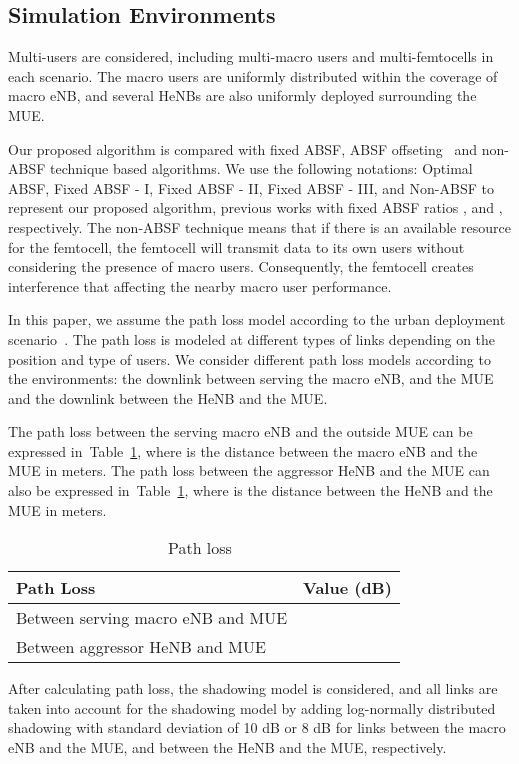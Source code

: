 \documentclass[paper]{ieice}
\begin{document}
\subsection{Simulation Environments}
\label{Eval-Envi}
Multi-users are considered, including multi-macro users and multi-femtocells in each scenario. The macro users are uniformly distributed within the coverage of macro eNB, and several HeNBs are also uniformly deployed surrounding the MUE.

Our proposed algorithm is compared with fixed ABSF, ABSF offseting~\cite{Kamel2013} and non-ABSF technique based algorithms. We use the following notations: Optimal ABSF, Fixed ABSF - I, Fixed ABSF - II, Fixed ABSF - III, and Non-ABSF  to represent our proposed algorithm, previous works with fixed ABSF ratios , and , respectively. The non-ABSF technique means that if there is an available resource for the femtocell, the femtocell will transmit data to its own users without considering the presence of macro users. Consequently, the femtocell creates interference that affecting the nearby macro user performance.

In this paper, we assume the path loss model according to the urban deployment scenario~\cite{R4-092042}. The path loss is modeled at different types of links depending on the position and type of users. We consider different path loss models according to the environments: the downlink between serving the macro eNB, and the MUE and the downlink between the HeNB and the MUE.

The path loss between the serving  macro eNB and the outside MUE can be expressed in~Table~\ref{Tab-PathLoss}, where  is the distance between the  macro eNB and the MUE in meters. The path loss between the aggressor HeNB and the MUE can also be expressed in~Table~\ref{Tab-PathLoss}, where  is the distance between the HeNB and the MUE in meters.
\begin{table} [t]
\caption{Path loss~\cite{R4-092042}} \centering \begin{tabular}{l l} \hline Path Loss & Value (dB) \\ \hline Between serving  macro eNB and MUE                  &  \\
Between aggressor HeNB and MUE              &   \\ \hline \end{tabular}
\label{Tab-PathLoss} \end{table}

After calculating path loss, the shadowing model is considered, and all links are taken into account for the shadowing model by adding log-normally distributed shadowing with standard deviation of 10 dB or 8 dB for links between the  macro eNB and the MUE, and between the HeNB and the MUE, respectively.
\end{document}
